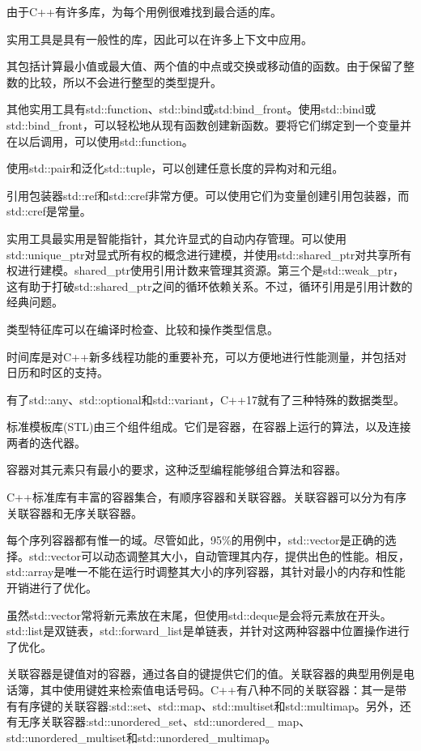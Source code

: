 由于C++有许多库，为每个用例很难找到最合适的库。


实用工具是具有一般性的库，因此可以在许多上下文中应用。

其包括计算最小值或最大值、两个值的中点或交换或移动值的函数。由于保留了整数的比较，所以不会进行整型的类型提升。

其他实用工具有std::function、std::bind或std:bind\_front。使用std::bind或std::bind\_front，可以轻松地从现有函数创建新函数。要将它们绑定到一个变量并在以后调用，可以使用std::function。

使用std::pair和泛化std::tuple，可以创建任意长度的异构对和元组。

引用包装器std::ref和std::cref非常方便。可以使用它们为变量创建引用包装器，而std::cref是常量。

实用工具最实用是智能指针，其允许显式的自动内存管理。可以使用std::unique\_ptr对显式所有权的概念进行建模，并使用std::shared\_ptr对共享所有权进行建模。shared\_ptr使用引用计数来管理其资源。第三个是std::weak\_ptr，这有助于打破std::shared\_ptr之间的循环依赖关系。不过，循环引用是引用计数的经典问题。

类型特征库可以在编译时检查、比较和操作类型信息。

时间库是对C++新多线程功能的重要补充，可以方便地进行性能测量，并包括对日历和时区的支持。

有了std::any、std::optional和std::variant，C++17就有了三种特殊的数据类型。



标准模板库(STL)由三个组件组成。它们是容器，在容器上运行的算法，以及连接两者的迭代器。

容器对其元素只有最小的要求，这种泛型编程能够组合算法和容器。

C++标准库有丰富的容器集合，有顺序容器和关联容器。关联容器可以分为有序关联容器和无序关联容器。

每个序列容器都有惟一的域。尽管如此，95\%的用例中，std::vector是正确的选择。std::vector可以动态调整其大小，自动管理其内存，提供出色的性能。相反，std::array是唯一不能在运行时调整其大小的序列容器，其针对最小的内存和性能开销进行了优化。

虽然std::vector常将新元素放在末尾，但使用std::deque是会将元素放在开头。std::list是双链表，std::forward\_list是单链表，并针对这两种容器中位置操作进行了优化。

关联容器是键值对的容器，通过各自的键提供它们的值。关联容器的典型用例是电话簿，其中使用键姓来检索值电话号码。C++有八种不同的关联容器：其一是带有有序键的关联容器:std::set、std::map、std::multiset和std::multimap。另外，还有无序关联容器:std::unordered\_set、std::unordered\_ map、std::unordered\_multiset和std::unordered\_multimap。


